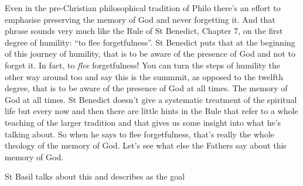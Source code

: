 Even in the pre-Christian philosophical tradition of Philo there's an effort to emphasise preserving the memory of God and never forgetting it. And that phrase sounds very much like the Rule of St Benedict, Chapter 7, on the first degree of humility: ``to flee forgetfulness''. St Benedict puts that at the beginning of this journey of humility, that is to be aware of the presence of God and not to forget it. In fact, to \emph{flee} forgetfulness! You can turn the steps of humility the other way around too and say this is the summmit, as opposed to the twelfth degree, that is to be aware of the presence of God at all times. The memory of God at all times. St Benedict doesn't give a systematic treatment of the spiritual life but every now and then there are little hints in the Rule that refer to a whole teaching of the larger tradition and that gives us some insight into what he's talking about. So when he says to flee forgetfulness, that's really the whole theology of the memory of God. Let's see what else the Fathers say about this memory of God.

St Basil talks about this and describes as the goal






